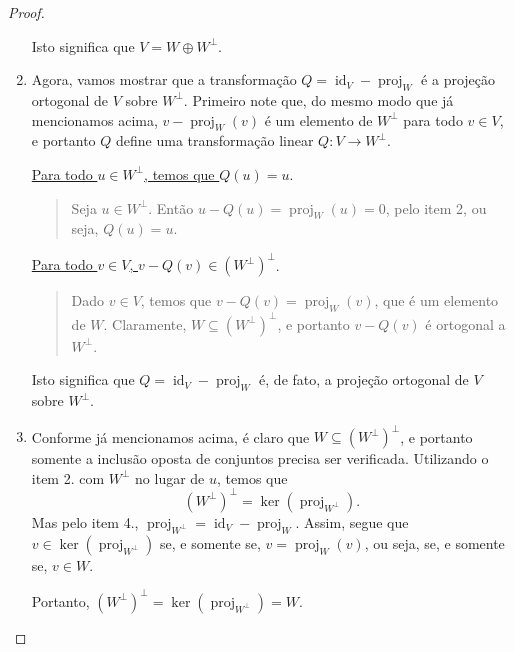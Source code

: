 \begin{proof}
\begin{enumerate}
		Isto significa que $V=W\oplus W^\perp$.
		
		\item Agora, vamos mostrar que a transformação $Q=\operatorname{id}_V-\operatorname{proj}_W$ é a projeção ortogonal de $V$ sobre $W^\perp$. Primeiro note que, do mesmo modo que já mencionamos acima, $v-\operatorname{proj}_W(v)$ é um elemento de $W^\perp$ para todo $v\in V$, e portanto $Q$ define uma transformação linear $Q\colon V\to W^\perp$.
		
		\uline{Para todo $u\in W^\perp$, temos que $Q(u)=u$}.
		\begin{quote}
			Seja $u\in W^\perp$. Então $u-Q(u)=\operatorname{proj}_W(u)=0$, pelo item 2, ou seja, $Q(u)=u$.
		\end{quote}
		
		\uline{Para todo $v\in V$, $v-Q(v)\in \left(W^\perp\right)^\perp$}.
		\begin{quote}
			Dado $v\in V$, temos que $v-Q(v)=\operatorname{proj}_W(v)$, que é um elemento de $W$. Claramente, $W\subseteq\left(W^\perp\right)^\perp$, e portanto $v-Q(v)$ é ortogonal a $W^\perp$.
		\end{quote}
		
		Isto significa que $Q=\operatorname{id}_V-\operatorname{proj}_W$ é, de fato, a projeção ortogonal de $V$ sobre $W^\perp$.
		
		\item Conforme já mencionamos acima, é claro que $W\subseteq\left(W^\perp\right)^\perp$, e portanto somente a inclusão oposta de conjuntos precisa ser verificada. Utilizando o item 2. com $W^\perp$ no lugar de $u$, temos que
		\[\left(W^\perp\right)^\perp=\ker(\operatorname{proj}_{W^\perp}).\]
		Mas pelo item 4., $\operatorname{proj}_{W^\perp}=\operatorname{id}_V-\operatorname{proj}_W$. Assim, segue que $v\in\ker(\operatorname{proj}_{W^\perp})$ se, e somente se, $v=\operatorname{proj}_W(v)$, ou seja, se, e somente se, $v\in W$.
		
		Portanto, $\left(W^\perp\right)^\perp=\ker(\operatorname{proj}_{W^\perp})=W$.
	\end{enumerate}
\end{proof}